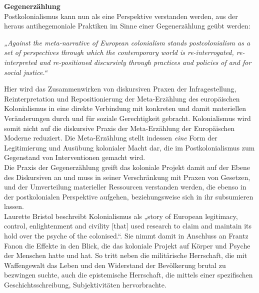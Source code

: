 \textbf{\large Gegenerzählung}\\
Postkolonialismus kann nun als eine Perspektive verstanden werden, aus der
heraus antihegemoniale Praktiken im Sinne einer Gegenerzählung geübt werden:
\begin{myenv}
  \textit{„Against the meta-narrative of European colonialism stands
  postcolonialism as a set of perspectives through which the contemporary world
is re-interrogated, re-interpreted and re-positioned discursivly through
practices and policies of and for social justice.“\footnotemark
{}}
\end{myenv}
Hier wird das Zusammenwirken von diskursiven Praxen der Infragestellung,
Reinterpretation und Repositionierung der Meta-Erzählung des europäischen
Kolonialismus in eine direkte Verbindung mit konkreten und damit materiellen
Veränderungen durch und für soziale Gerechtigkeit gebracht. Kolonialismus wird
somit nicht auf die diskursive Praxis der Meta-Erzählung der Europäischen
Moderne reduziert. Die Meta-Erzählung stellt indessen \textit{eine} Form der
Legitimierung und Ausübung kolonialer Macht dar, die im Postkolonialismus zum
Gegenstand von Interventionen gemacht wird.\footnotemark{}\\
Die Praxis der Gegenerzählung greift das
koloniale Projekt damit auf der Ebene des Diskursiven an und muss in seiner
Verschränkung mit Praxen von Gesetzen, und der Umverteilung materieller
Ressourcen verstanden werden, die ebenso in der postkolonialen Perspektive
aufgehen, beziehungsweise sich in ihr subsumieren lassen.\\

Laurette Bristol beschreibt Kolonialismus als „story of European legitimacy,
control, enlightenment and civility [that] used research to claim and maintain
its hold over the psyche of the colonised.“\footnotemark {}. Sie nimmt damit in Anschluss an
Frantz Fanon die Effekte in den Blick, die das koloniale Projekt auf Körper und
Psyche der Menschen hatte und hat. So tritt neben die militärische Herrschaft,
die mit Waffengewalt das Leben und den Widerstand der Bevölkerung brutal zu
bezwingen suchte, auch die epistemische Herrschaft, die mittels einer
spezifischen Geschichtsschreibung, Subjektivitäten
hervorbrachte.\footnotemark{}\\

